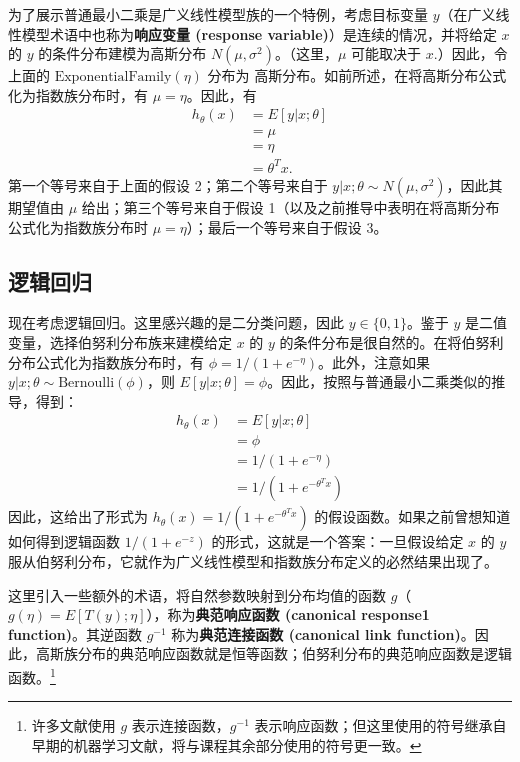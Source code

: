 为了展示普通最小二乘是广义线性模型族的一个特例，考虑目标变量 $y$（在广义线性模型术语中也称为\textbf{响应变量 (response variable)}）是连续的情况，并将给定 $x$ 的 $y$ 的条件分布建模为高斯分布 $N(\mu, \sigma^2)$。（这里，$\mu$ 可能取决于 $x$.）因此，令上面的 $\text{ExponentialFamily}(\eta)$ 分布为 高斯分布。如前所述，在将高斯分布公式化为指数族分布时，有 $\mu = \eta$。因此，有
\[
\begin{aligned}
    h_\theta(x) &= E[y|x; \theta] \\
    &= \mu \\
    &= \eta \\
    &= \theta^T x.
\end{aligned}
\]
第一个等号来自于上面的假设 2；第二个等号来自于 $y|x; \theta \sim N(\mu, \sigma^2)$，因此其期望值由 $\mu$ 给出；第三个等号来自于假设 1（以及之前推导中表明在将高斯分布公式化为指数族分布时 $\mu = \eta$）；最后一个等号来自于假设 3。

\subsection{逻辑回归}

现在考虑逻辑回归。这里感兴趣的是二分类问题，因此 $y \in \{0, 1\}$。鉴于 $y$ 是二值变量，选择伯努利分布族来建模给定 $x$ 的 $y$ 的条件分布是很自然的。在将伯努利分布公式化为指数族分布时，有 $\phi = 1/(1 + e^{-\eta})$。此外，注意如果 $y|x; \theta \sim \text{Bernoulli}(\phi)$，则 $E[y|x; \theta] = \phi$。因此，按照与普通最小二乘类似的推导，得到：
\[
\begin{aligned}
    h_\theta(x) &= E[y|x; \theta] \\
    &= \phi \\
    &= 1/(1 + e^{-\eta}) \\
    &= 1/(1 + e^{-\theta^T x})
\end{aligned}
\]
因此，这给出了形式为 $h_\theta(x) = 1/(1 + e^{-\theta^T x})$ 的假设函数。如果之前曾想知道如何得到逻辑函数 $1/(1 + e^{-z})$ 的形式，这就是一个答案：一旦假设给定 $x$ 的 $y$ 服从伯努利分布，它就作为广义线性模型和指数族分布定义的必然结果出现了。

这里引入一些额外的术语，将自然参数映射到分布均值的函数 $g$（$g(\eta) = E[T(y); \eta]$），称为\textbf{典范响应函数 (canonical response1 function)}。其逆函数 $g^{-1}$ 称为\textbf{典范连接函数 (canonical link function)}。因此，高斯族分布的典范响应函数就是恒等函数；伯努利分布的典范响应函数是逻辑函数。\footnote{许多文献使用 $g$ 表示连接函数，$g^{-1}$ 表示响应函数；但这里使用的符号继承自早期的机器学习文献，将与课程其余部分使用的符号更一致。}
